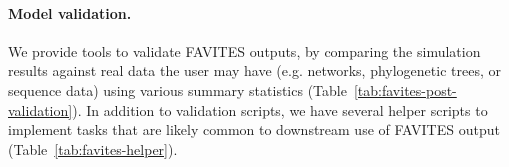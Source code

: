 \paragraph{Model validation.} We provide tools to validate FAVITES outputs, by comparing the simulation results against real data the user may have (e.g. networks, phylogenetic trees, or sequence data) using various summary statistics (Table~\ref{tab:favites-post-validation}). In addition to validation scripts, we have several helper scripts to implement tasks that are likely common to downstream use of FAVITES output (Table~\ref{tab:favites-helper}).

